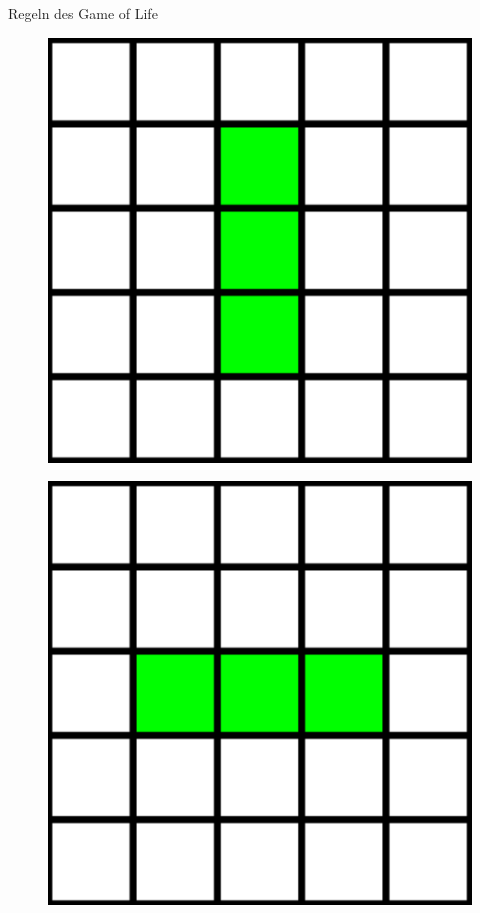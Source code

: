 \documentclass[aspectratio=169]{beamer}
\begin{document}
\begin{frame}{Regeln des Game of Life}
\begin{multicols*}{3}
      \begin{figure}[H]
          \centering
          \includegraphics[height = 0.3 \textheight]{end_oscillator.png}
      \end{figure}

      \pause

      \begin{figure}[H]
          \centering
          \includegraphics[height = 0.3 \textheight]{start_oscillator.png}
      \end{figure}

    \end{multicols*}

  \end{frame}
\end{document}
